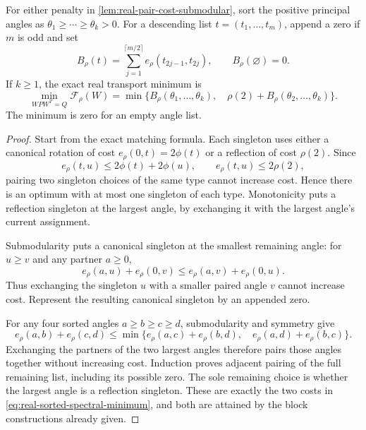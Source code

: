 \begin{theorem}
\label{thm:real-sorted-spectral-minimum}
For either penalty in \cref{lem:real-pair-cost-submodular}, sort the positive
principal angles as $\theta_1\geq\cdots\geq\theta_k>0$.
For a descending list $t=(t_1,\ldots,t_m)$, append a zero if $m$ is
odd and set
\[
 B_\rho(t)=\sum_{j=1}^{\lceil m/2\rceil}
                 e_\rho(t_{2j-1},t_{2j}),\qquad
 B_\rho(\varnothing)=0.
\]
If $k\geq1$, the exact real transport minimum is
\begin{equation}
 \min_{WPW^T=Q}\mathcal F_\rho(W)
  =\min\{B_\rho(\theta_1,\ldots,\theta_k),\quad
          \rho(2)+B_\rho(\theta_2,\ldots,\theta_k)\}.
 \label{eq:real-sorted-spectral-minimum}
\end{equation}
The minimum is zero for an empty angle list.
\end{theorem}

\begin{proof}
Start from the exact matching formula. Each singleton uses either a
canonical rotation of cost $e_\rho(0,t)=2\phi(t)$ or a reflection of
cost $\rho(2)$. Since
\[
 e_\rho(t,u)\leq2\phi(t)+2\phi(u),\qquad
 e_\rho(t,u)\leq2\rho(2),
\]
pairing two singleton choices of the same type cannot increase cost.
Hence there is an optimum with at most one singleton of each type.
Monotonicity puts a reflection singleton at the largest angle, by
exchanging it with the largest angle's current assignment.

Submodularity puts a canonical singleton at the smallest remaining angle:
for $u\geq v$ and any partner $a\geq0$,
\[
 e_\rho(a,u)+e_\rho(0,v)
       \leq e_\rho(a,v)+e_\rho(0,u).
\]
Thus exchanging the singleton $u$ with a smaller paired angle $v$ cannot
increase cost. Represent the resulting canonical singleton by an appended
zero.

For any four sorted angles $a\geq b\geq c\geq d$, submodularity and
symmetry give
\[
 e_\rho(a,b)+e_\rho(c,d)
   \leq\min\{e_\rho(a,c)+e_\rho(b,d),\quad
             e_\rho(a,d)+e_\rho(b,c)\}.
\]
Exchanging the partners of the two largest angles therefore pairs those
angles together without increasing cost. Induction proves adjacent
pairing of the full remaining list, including its possible zero.
The sole remaining choice is whether the largest angle is a reflection
singleton. These are exactly the two costs in
\cref{eq:real-sorted-spectral-minimum}, and both are attained by the
block constructions already given.
\end{proof}


